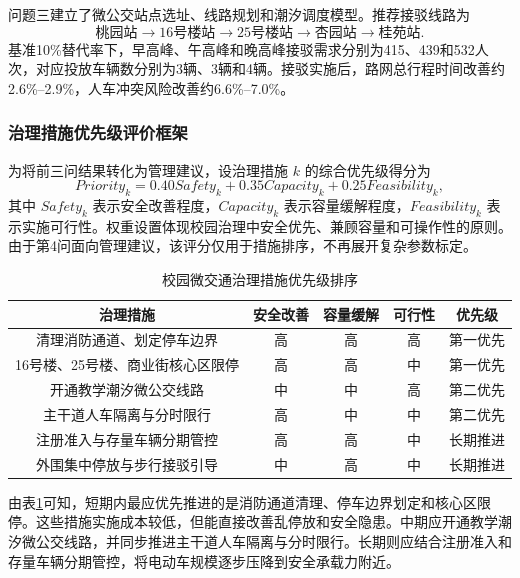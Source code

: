 \documentclass[UTF8,zihao=-4,a4paper]{ctexart}
\begin{document}
问题三建立了微公交站点选址、线路规划和潮汐调度模型。推荐接驳线路为
\begin{equation}
\text{桃园站}\rightarrow\text{16号楼站}\rightarrow\text{25号楼站}\rightarrow\text{杏园站}\rightarrow\text{桂苑站}.
\end{equation}
基准10\%替代率下，早高峰、午高峰和晚高峰接驳需求分别为415、439和532人次，对应投放车辆数分别为3辆、3辆和4辆。接驳实施后，路网总行程时间改善约2.6\%--2.9\%，人车冲突风险改善约6.6\%--7.0\%。

\subsubsection{治理措施优先级评价框架}

为将前三问结果转化为管理建议，设治理措施 $k$ 的综合优先级得分为
\begin{equation}
Priority_k=0.40Safety_k+0.35Capacity_k+0.25Feasibility_k,
\end{equation}
其中 $Safety_k$ 表示安全改善程度，$Capacity_k$ 表示容量缓解程度，$Feasibility_k$ 表示实施可行性。权重设置体现校园治理中安全优先、兼顾容量和可操作性的原则。由于第4问面向管理建议，该评分仅用于措施排序，不再展开复杂参数标定。

\begin{table}[H]
\centering
\caption{校园微交通治理措施优先级排序}
\label{tab:priority_q4}
\begin{tabular}{ccccc}
\toprule
\textbf{治理措施} & \textbf{安全改善} & \textbf{容量缓解} & \textbf{可行性} & \textbf{优先级} \\
\midrule
清理消防通道、划定停车边界 & 高 & 高 & 高 & 第一优先 \\
16号楼、25号楼、商业街核心区限停 & 高 & 高 & 中 & 第一优先 \\
开通教学潮汐微公交线路 & 中 & 中 & 高 & 第二优先 \\
主干道人车隔离与分时限行 & 高 & 中 & 中 & 第二优先 \\
注册准入与存量车辆分期管控 & 高 & 高 & 中 & 长期推进 \\
外围集中停放与步行接驳引导 & 中 & 高 & 中 & 长期推进 \\
\bottomrule
\end{tabular}
\end{table}

由表\ref{tab:priority_q4}可知，短期内最应优先推进的是消防通道清理、停车边界划定和核心区限停。这些措施实施成本较低，但能直接改善乱停放和安全隐患。中期应开通教学潮汐微公交线路，并同步推进主干道人车隔离与分时限行。长期则应结合注册准入和存量车辆分期管控，将电动车规模逐步压降到安全承载力附近。
\end{document}

